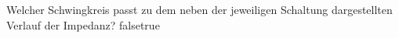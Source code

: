     {Welcher Schwingkreis passt zu dem neben der jeweiligen Schaltung dargestellten Verlauf der Impedanz?}
    {}
    {}
    {}
    {}
    {false}{true}